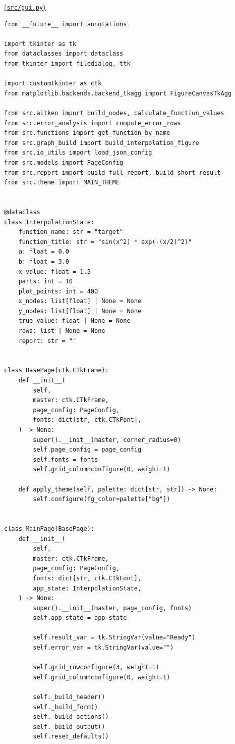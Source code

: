 \documentclass[12pt,a4paper]{article}
\begin{document}
    \noindent
    \underline{(\texttt{src/gui.py})}

    \begin{verbatim}
from __future__ import annotations

import tkinter as tk
from dataclasses import dataclass
from tkinter import filedialog, ttk

import customtkinter as ctk
from matplotlib.backends.backend_tkagg import FigureCanvasTkAgg

from src.aitken import build_nodes, calculate_function_values
from src.error_analysis import compute_error_rows
from src.functions import get_function_by_name
from src.graph_build import build_interpolation_figure
from src.io_utils import load_json_config
from src.models import PageConfig
from src.report import build_full_report, build_short_result
from src.theme import MAIN_THEME


@dataclass
class InterpolationState:
    function_name: str = "target"
    function_title: str = "sin(x^2) * exp(-(x/2)^2)"
    a: float = 0.0
    b: float = 3.0
    x_value: float = 1.5
    parts: int = 10
    plot_points: int = 400
    x_nodes: list[float] | None = None
    y_nodes: list[float] | None = None
    true_value: float | None = None
    rows: list | None = None
    report: str = ""


class BasePage(ctk.CTkFrame):
    def __init__(
        self,
        master: ctk.CTkFrame,
        page_config: PageConfig,
        fonts: dict[str, ctk.CTkFont],
    ) -> None:
        super().__init__(master, corner_radius=0)
        self.page_config = page_config
        self.fonts = fonts
        self.grid_columnconfigure(0, weight=1)

    def apply_theme(self, palette: dict[str, str]) -> None:
        self.configure(fg_color=palette["bg"])


class MainPage(BasePage):
    def __init__(
        self,
        master: ctk.CTkFrame,
        page_config: PageConfig,
        fonts: dict[str, ctk.CTkFont],
        app_state: InterpolationState,
    ) -> None:
        super().__init__(master, page_config, fonts)
        self.app_state = app_state

        self.result_var = tk.StringVar(value="Ready")
        self.error_var = tk.StringVar(value="")

        self.grid_rowconfigure(3, weight=1)
        self.grid_columnconfigure(0, weight=1)

        self._build_header()
        self._build_form()
        self._build_actions()
        self._build_output()
        self.reset_defaults()


\end{verbatim}
\end{document}
